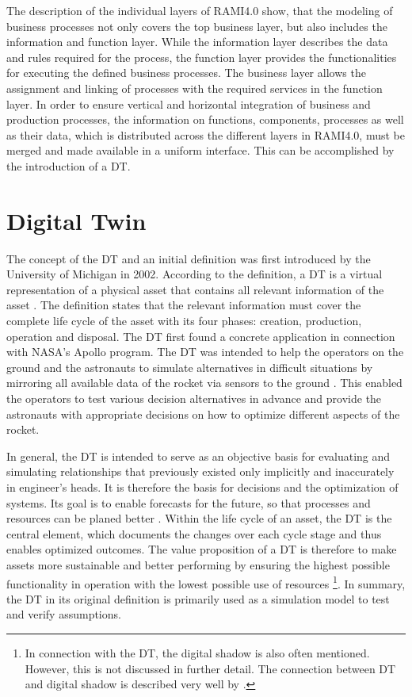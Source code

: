The description of the individual layers of \ac{RAMI4.0} show, that the modeling of business processes not only covers the top business layer, but also includes the information and function layer. While the information layer describes the data and rules required for the process, the function layer provides the functionalities for executing the defined business processes. The business layer allows the assignment and linking of processes with the required services in the function layer. In order to ensure vertical and horizontal integration of business and production processes, the information on functions, components, processes as well as their data, which is distributed across the different layers in \ac{RAMI4.0}, must be merged and made available in a uniform interface. This can be accomplished by the introduction of a \ac{DT}.

\section{Digital Twin}\label{sec:digitaltwin}

The concept of the \ac{DT} and an initial definition was first introduced by the University of Michigan in 2002. According to the definition, a \ac{DT} is a virtual representation of a physical asset that contains all relevant information of the asset \cite[p. 92]{Grieves2017DigitalSystems}. The definition states that the relevant information must cover the complete life cycle of the asset with its four phases: creation, production, operation and disposal. The \ac{DT} first found a concrete application in connection with NASA's Apollo program. The \ac{DT} was intended to help the operators on the ground and the astronauts to simulate alternatives in difficult situations by mirroring all available data of the rocket via sensors to the ground \cite[p. 94]{Grieves2017DigitalSystems}. This enabled the operators to test various decision alternatives in advance and provide the astronauts with appropriate decisions on how to optimize different aspects of the rocket. 

In general, the \ac{DT} is intended to serve as an objective basis for evaluating and simulating relationships that previously existed only implicitly and inaccurately in engineer's heads. It is therefore the basis for decisions and the optimization of systems. Its goal is to enable forecasts for the future, so that processes and resources can be planed better \cite[p .96, p.97]{Grieves2017DigitalSystems}. Within the life cycle of an asset, the \ac{DT} is the central element, which documents the changes over each cycle stage and thus enables optimized outcomes. The value proposition of a \ac{DT} is therefore to make assets more sustainable and better performing by ensuring the highest possible functionality in operation with the lowest possible use of resources \cite[p. 102]{Grieves2017DigitalSystems}
\footnote{In connection with the \ac{DT}, the digital shadow is also often mentioned. However, this is not discussed in further detail. The connection between \ac{DT} and digital shadow is described very well by \citet[p. 5]{Malakuti2021AnTwins}.}. In summary, the \ac{DT} in its original definition is primarily used as a simulation model to test and verify assumptions.

